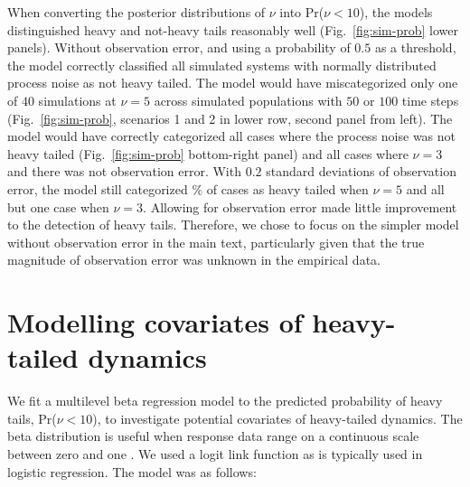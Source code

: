When converting the posterior distributions of $\nu$ into Pr($\nu < 10$), the
models distinguished heavy and not-heavy tails reasonably well
(Fig.~\ref{fig:sim-prob} lower panels). Without observation error, and using a
probability of $0.5$ as a threshold, the model correctly classified all
simulated systems with normally distributed process noise as not heavy tailed.
The model would have miscategorized only one of $40$ simulations at $\nu = 5$
across simulated populations with $50$ or $100$ time steps
(Fig.~\ref{fig:sim-prob}, scenarios 1 and 2 in lower row, second panel from
left). The model would have correctly categorized all cases where the process
noise was not heavy tailed (Fig.~\ref{fig:sim-prob} bottom-right panel) and
all cases where $\nu = 3$ and there was not observation error. With $0.2$
standard deviations of observation error, the model still categorized
\obsErrorNuFivePerc\% of cases as heavy tailed when $\nu = 5$ and all but one
case when $\nu = 3$. Allowing for observation error made little improvement to
the detection of heavy tails. Therefore, we chose to focus on the simpler
model without observation error in the main text, particularly given that the
true magnitude of observation error was unknown in the empirical data.

\section{Modelling covariates of heavy-tailed dynamics}

We fit a multilevel beta regression model to the predicted probability of
heavy tails, Pr($\nu < 10$), to investigate potential covariates of
heavy-tailed dynamics. The beta distribution is useful when response data
range on a continuous scale between zero and one \citep{ferrari2004}. We used
a logit link function as is typically used in logistic regression. The model
was as follows:

